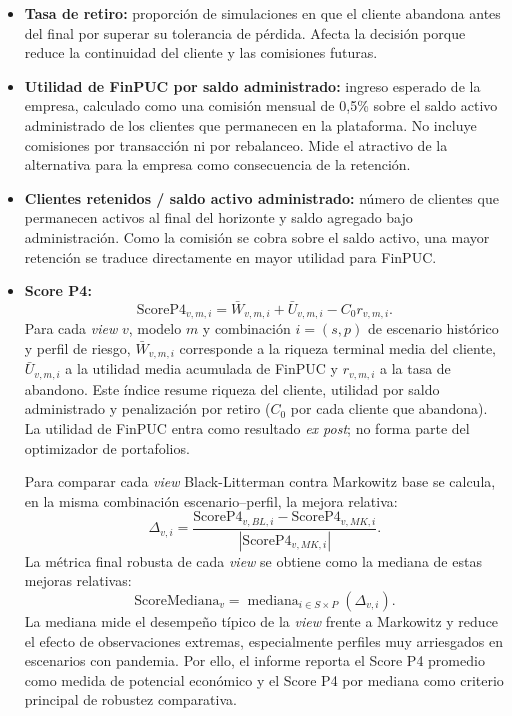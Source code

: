 \begin{itemize}
    \item \textbf{Tasa de retiro:} proporci\'on de simulaciones en que el
    cliente abandona antes del final por superar su tolerancia de p\'erdida.
    Afecta la decisi\'on porque reduce la continuidad del cliente y las
    comisiones futuras.

    \item \textbf{Utilidad de FinPUC por saldo administrado:} ingreso esperado
    de la empresa, calculado como una comisi\'on mensual de 0,5\% sobre el saldo
    activo administrado de los clientes que permanecen en la plataforma. No
    incluye comisiones por transacci\'on ni por rebalanceo. Mide el atractivo de
    la alternativa para la empresa como consecuencia de la retenci\'on.

    \item \textbf{Clientes retenidos / saldo activo administrado:} n\'umero de
    clientes que permanecen activos al final del horizonte y saldo agregado bajo
    administraci\'on. Como la comisi\'on se cobra sobre el saldo activo, una
    mayor retenci\'on se traduce directamente en mayor utilidad para FinPUC.

    \item \textbf{Score P4:}
    \begin{equation}
    \label{eq:score_p4}
    \text{ScoreP4}_{v,m,i}
    =
    \bar{W}_{v,m,i}
    +
    \bar{U}_{v,m,i}
    -
    C_0 r_{v,m,i}.
    \end{equation}
    Para cada \textit{view} $v$, modelo $m$ y combinaci\'on
    $i=(s,p)$ de escenario hist\'orico y perfil de riesgo, $\bar{W}_{v,m,i}$
    corresponde a la riqueza terminal media del cliente, $\bar{U}_{v,m,i}$ a
    la utilidad media acumulada de FinPUC y $r_{v,m,i}$ a la tasa de abandono.
    Este \'indice resume riqueza del cliente, utilidad por saldo administrado y
    penalizaci\'on por retiro ($C_0$ por cada cliente que abandona). La utilidad
    de FinPUC entra como resultado \emph{ex post}; no forma parte del
    optimizador de portafolios.

    Para comparar cada \textit{view} Black-Litterman contra Markowitz base se
    calcula, en la misma combinaci\'on escenario--perfil, la mejora relativa:
    \begin{equation}
    \label{eq:delta_score_p4}
    \Delta_{v,i}
    =
    \frac{
    \text{ScoreP4}_{v,BL,i}
    -
    \text{ScoreP4}_{v,MK,i}
    }{
    |\text{ScoreP4}_{v,MK,i}|
    }.
    \end{equation}
    La m\'etrica final robusta de cada \textit{view} se obtiene como la mediana
    de estas mejoras relativas:
    \begin{equation}
    \label{eq:score_p4_mediana}
    \text{ScoreMediana}_{v}
    =
    \operatorname{mediana}_{i \in S \times P}
    \left(\Delta_{v,i}\right).
    \end{equation}
    La mediana mide el desempe\~no t\'ipico de la \textit{view} frente a
    Markowitz y reduce el efecto de observaciones extremas, especialmente
    perfiles muy arriesgados en escenarios con pandemia. Por ello, el informe
    reporta el Score P4 promedio como medida de potencial econ\'omico y el
    Score P4 por mediana como criterio principal de robustez comparativa.


\end{itemize}
